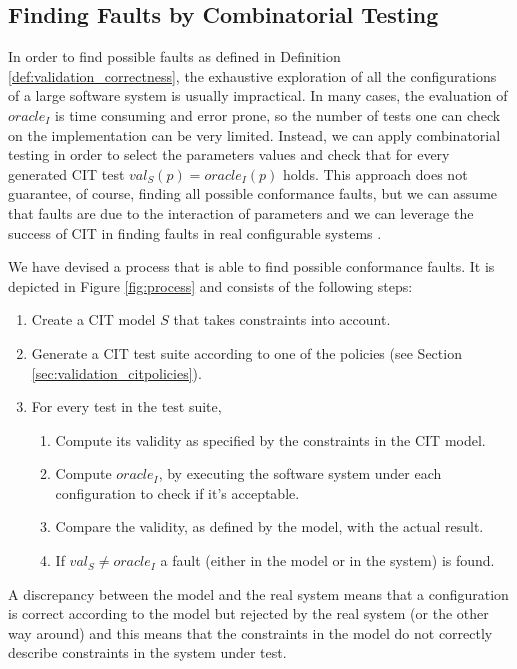 \begin{tikzborder}{\cite{Gargantini16:validation}}
	\subsection{Finding Faults by Combinatorial Testing}
	
	\bb In order to find possible faults as defined in Definition \ref{def:validation_correctness}, the exhaustive exploration of all the configurations of a large software system is usually impractical. In many cases, the evaluation of $oracle_I$ is time consuming and error prone, so the number of tests one can check on the implementation can be very limited. Instead, we can apply combinatorial testing in order to select the parameters values and check that for every generated CIT test $val_{S}(p) = oracle_I(p)$ holds. This approach does not guarantee, of course, finding all possible conformance faults, but we can assume that faults are due to the interaction of parameters and we can leverage the success of CIT in finding faults in real configurable systems \cite{KuhnTSE04,Petke15:practical}.
	
	We have devised a process that is able to find possible conformance faults. It is depicted in Figure \ref{fig:process}
	and consists of the following steps:
	
	\begin{enumerate}
		\item Create a CIT model $S$ that takes constraints into account.
		\item Generate a CIT test suite according to one of the policies (see Section \ref{sec:validation_citpolicies}).
		\item For every test in the test suite, 
		\begin{enumerate}
			\item Compute its validity as specified by the constraints in the CIT model.
			\item Compute $oracle_I$, by executing the software system under each configuration to check if it's acceptable.%
			\item Compare the validity, as defined by the model, with the actual result.
			\item If $val_{S}\neq oracle_{I}$ a fault (either in the model or in the system) is found.
		\end{enumerate}
	\end{enumerate}
	
	A discrepancy between the model and the real system means that a configuration is correct according to the model but rejected by the real system (or the other way around) and this means that the constraints in the model do not correctly describe constraints in the system under test.
	\be
	

\end{tikzborder}
